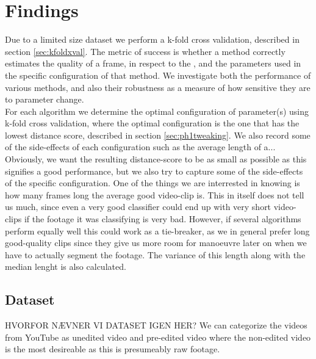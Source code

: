\section{Findings}
%
Due to a limited size dataset we perform a k-fold cross validation, described in section \ref{sec:kfoldxval}. The metric of success is whether a method correctly estimates the quality of a frame, in respect to the , and the parameters used in the specific configuration of that method. We investigate both the performance of various methods, and also their robustness as a measure of how sensitive they are to parameter change.\\
For each algorithm we determine the optimal configuration of parameter(s) using k-fold cross validation, where the optimal configuration is the one that has the lowest distance score, described in section \ref{sec:ph1tweaking}. We also record some of the side-effects of each configuration such as the average length of a...\\
Obviously, we want the resulting distance-score to be as small as possible as this signifies a good performance, but we also try to capture some of the side-effects of the specific configuration. One of the things we are interrested in knowing is how many frames long the average good video-clip is. This in itself does not tell us much, since even a very good classifier could end up with very short video-clips if the footage it was classifying is very bad. However, if several algorithms perform equally well this could work as a tie-breaker, as we in general prefer long good-quality clips since they give us more room for manoeuvre later on when we have to actually segment the footage. The variance of this length along with the median lenght is also calculated.
%
\subsection{Dataset}
%
HVORFOR NÆVNER VI DATASET IGEN HER?
We can categorize the videos from YouTube as unedited video and pre-edited video where the non-edited video is the most desireable as this is presumeably raw footage.
%
